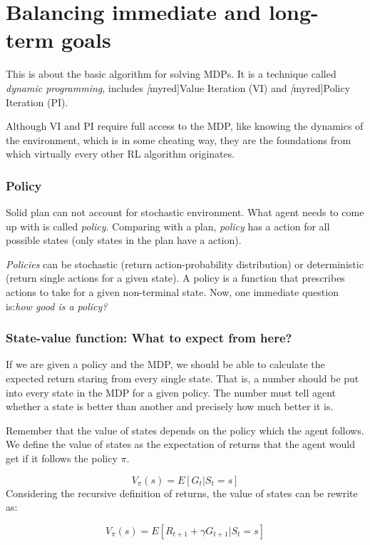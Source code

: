 \part{Balancing immediate and long-term goals}
    This is about the basic algorithm for solving MDPs. It is a technique called \emph{dynamic programming}, includes \emph[myred]{Value Iteration (VI)} and \emph[myred]{Policy Iteration (PI)}. \par
    Although VI and PI require full access to the MDP, like knowing the dynamics of the environment, which is in some cheating way, they are the foundations from which virtually every other RL algorithm originates.

    \section{Policy}
    Solid plan can not account for stochastic environment. What agent needs to come up with is called \emph{policy}. Comparing with a plan, \emph{policy} has a action for all possible states (only states in the plan have a action).\par
    \emph{Policies} can be stochastic (return action-probability distribution) or deterministic (return single actions for a given state). A policy is a function that prescribes actions to take for a given non-terminal state.
    Now, one immediate question is:{\itshape how good is a policy?}

    \section{State-value function: What to expect from here?}
    If we are given a policy and the MDP, we should be able to calculate the expected return staring from every single state. That is, a number should be put into every state in the MDP for a given policy. The number must tell agent whether a state is better than another and precisely how much better it is. \par
    Remember that the value of states depends on the policy which the agent follows. We define the value of states as the expectation of returns that the agent would get if it follows the policy $\pi$. 
    \begin{definition}
        \begin{equation}
            V_{\pi}(s)=E[G_t|S_t=s]
        \end{equation}
        Considering the recursive definition of returns, the value of states can be rewrite as:

        \begin{equation}
            V_{\pi}(s)=E[R_{t+1}+\gamma G_{t+1}|S_t=s]
        \end{equation}
    \end{definition}

